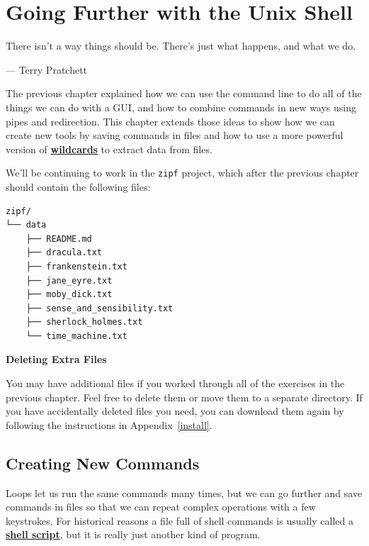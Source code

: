 \documentclass[
]{krantz}
\renewenvironment{quote}{\begin{VF}}{\end{VF}}
\newcommand{\gref}[2]{\hyperlink{#2}{\textbf{#1}}}
\begin{document}
\hypertarget{bash-advanced}{%
\chapter{Going Further with the Unix Shell}\label{bash-advanced}}

\begin{quote}
There isn't a way things should be. There's just what happens, and what we do.

--- Terry Pratchett
\end{quote}

The previous chapter explained how we can use the command line
to do all of the things we can do with a GUI,
and how to combine commands in new ways using pipes and redirection.
This chapter extends those ideas to show
how we can create new tools by saving commands in files
and how to use a more powerful version of \gref{wildcards}{wildcard}
to extract data from files.

We'll be continuing to work in the \texttt{zipf} project,
which after the previous chapter should contain the following files:

\begin{verbatim}
zipf/
└── data
    ├── README.md
    ├── dracula.txt
    ├── frankenstein.txt
    ├── jane_eyre.txt
    ├── moby_dick.txt
    ├── sense_and_sensibility.txt
    ├── sherlock_holmes.txt
    └── time_machine.txt
\end{verbatim}

\begin{quote}
\textbf{Deleting Extra Files}

You may have additional files
if you worked through all of the exercises in the previous chapter.
Feel free to delete them or move them to a separate directory.
If you have accidentally deleted files you need,
you can download them again by following the instructions in Appendix~\ref{install}.
\end{quote}

\hypertarget{bash-advanced-script}{%
\section{Creating New Commands}\label{bash-advanced-script}}

Loops let us run the same commands many times,
but we can go further and save commands in files
so that we can repeat complex operations with a few keystrokes.
For historical reasons
a file full of shell commands is usually called a \gref{shell script}{shell\_script},
but it is really just another kind of program.
\end{document}
